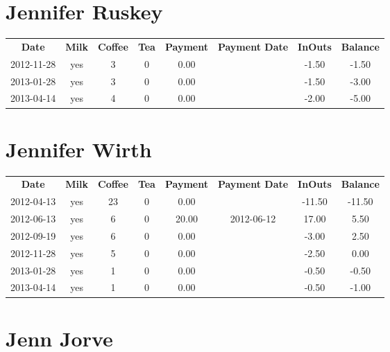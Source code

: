 \section{Jennifer Ruskey}

\begin{center}
\begin{tabular}{cccccccc}
\textbf{Date} & \textbf{Milk} & \textbf{Coffee} & \textbf{Tea} & \textbf{Payment} & \textbf{Payment Date} & \textbf{InOuts} & \textbf{Balance} \\
2012-11-28 & yes & 3 & 0 & 0.00 &  & -1.50 & -1.50\\ 
2013-01-28 & yes & 3 & 0 & 0.00 &  & -1.50 & -3.00\\ 
2013-04-14 & yes & 4 & 0 & 0.00 &  & -2.00 & -5.00
\end{tabular}
\end{center}

\section{Jennifer Wirth}

\begin{center}
\begin{tabular}{cccccccc}
\textbf{Date} & \textbf{Milk} & \textbf{Coffee} & \textbf{Tea} & \textbf{Payment} & \textbf{Payment Date} & \textbf{InOuts} & \textbf{Balance} \\
2012-04-13 & yes & 23 & 0 &  0.00 &  & -11.50 & -11.50\\ 
2012-06-13 & yes &  6 & 0 & 20.00 & 2012-06-12 &  17.00 &   5.50\\ 
2012-09-19 & yes &  6 & 0 &  0.00 &  &  -3.00 &   2.50\\ 
2012-11-28 & yes &  5 & 0 &  0.00 &  &  -2.50 &   0.00\\ 
2013-01-28 & yes &  1 & 0 &  0.00 &  &  -0.50 &  -0.50\\ 
2013-04-14 & yes &  1 & 0 &  0.00 &  &  -0.50 &  -1.00
\end{tabular}
\end{center}

\section{Jenn Jorve}


